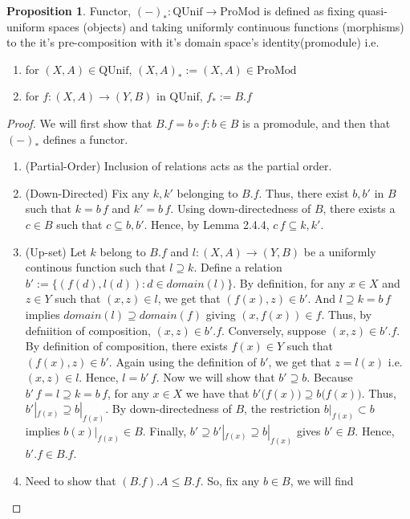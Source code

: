 \documentclass[18pt,a4paper]{article}
\theoremstyle{definition}
\newtheorem{proop}{Proposition}[section]
\begin{document}
\begin{proop} Functor, $(-)_*:\text{QUnif} \to \text{ProMod}$ is
	defined as fixing quasi-uniform spaces (objects) and taking
	uniformly continuous functions (morphisms) to the it's pre-composition with it's domain space's identity(promodule) i.e.
	\begin{enumerate}[label=(\alph*)]
		\item for $(X,A) \in \text{QUnif}$, $(X,A)_*:=(X,A) \in \text{ProMod}$
		\item for $f:(X,A) \to (Y,B)$ in QUnif,
			$f_* := B.f$
	\end{enumerate}
\end{proop}
\begin{proof}
	We will first show that $B.f={b \circ f: b \in B}$
	is a promodule, and then that $(-)_*$ defines a functor.
	\begin{enumerate}[label=(\roman*)]
		\item (Partial-Order) Inclusion of relations acts as the partial order.
		\item (Down-Directed) Fix any $k,k'$ belonging to $B.f$. Thus, there exist
			$b,b'$ in $B$ such that $k=b\,f$ and $k'=b\,f$. Using down-directedness
			of $B$, there exists a $c \in B$ such that $c \subseteq b,b'$. Hence,
			by Lemma 2.4.4, $c\,f \subseteq k,k'$.
		\item (Up-set) Let $k$ belong to $B.f$ and $l:(X,A) \to (Y,B)$ be a
			uniformly continous function such that $l \supseteq k$.
			Define a relation $b':= \{(f(d),l(d)): d \in domain(l) \}$.
			By definition, for any $x \in X$ and $z \in Y$ such that $(x,z) \in l$, we get that
			$(f(x),z)\in b'$. And $l \supseteq k=b\, f$ implies $domain(l)  \supseteq domain(f)$
			giving $(x,f(x)) \in f$. Thus, by defniition of composition,
			$(x,z) \in b'.f$. Conversely, suppose $(x,z) \in b'.f$.
			By definition of composition, there exists $f(x)\in Y$ such that
			$(f(x),z) \in b'$. Again using the definition of
			$b'$, we get that $z=l(x)$ i.e. $(x,z)\in l$. Hence, $l=b'\, f$.
			Now we will show that $b'\supseteq b$. Because $b'\, f=l \supseteq k=b\, f$, for any
			$x\in X$ we have that $b'\big(f(x)\big) \supseteq b\big(f(x)\big)$. Thus,
			$b'|_{f(x)} \supseteq b|_{f(x)}$. By down-directedness of $B$,
			the restriction $b|_{f(x)} \subset b$ implies $ b(x)|_{f(x)} \in B$.
			Finally, $b' \supseteq b'|_{f(x)} \supseteq b|_{f(x)}$ gives $b' \in B$.
			Hence, $b'.f \in B.f$.
		\item Need to show that $(B.f).A \leq B.f$. So, fix any $b\in B$, we will find

\end{enumerate}
\end{proof}
\end{document}
